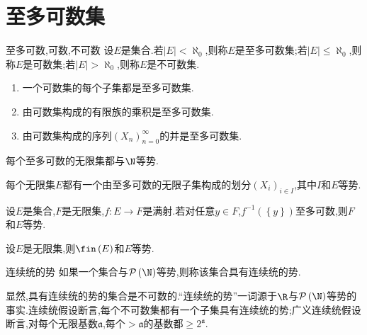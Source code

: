 \section{至多可数集}

\begin{definition}{至多可数,可数,不可数}{}
	设$E$是集合.若$\left|E\right|<\aleph_{0}$,则称$E$是至多可数集;若$\left|E\right|\leq\aleph_{0}$,则称$E$是可数集;若$\left|E\right|>\aleph_{0}$,则称$E$是不可数集.
\end{definition}

\begin{proposition}{}{}
	\begin{enumerate}
		\item 一个可数集的每个子集都是至多可数集.
		\item 由可数集构成的有限族的乘积是至多可数集.
		\item 由可数集构成的序列$\left(X_{n}\right)_{n=0}^{\infty}$的并是至多可数集.
	\end{enumerate}
\end{proposition}

\begin{proposition}{}{}
	每个至多可数的无限集都与$\N$等势.
\end{proposition}

\begin{proposition}{}{}
	每个无限集$E$都有一个由至多可数的无限子集构成的划分$\left(X_{i}\right)_{i\in I}$,其中$I$和$E$等势.
\end{proposition}

\begin{proposition}{}{}
	设$E$是集合,$F$是无限集,$f:E\to F$是满射.若对任意$y\in F$,$f^{-1}\left(\left\{y\right\}\right)$至多可数,则$F$和$E$等势.
\end{proposition}

\begin{proposition}{}{}
	设$E$是无限集,则$\fin\left(E\right)$和$E$等势.
\end{proposition}

\begin{definition}{连续统的势}{}
	如果一个集合与$\mathcal{P}\left(\N\right)$等势,则称该集合具有连续统的势.
\end{definition}

\begin{remark}{}{}
	显然,具有连续统的势的集合是不可数的.``连续统的势''一词源于$\R$与$\mathcal{P}\left(\N\right)$等势的事实.连续统假设断言,每个不可数集都有一个子集具有连续统的势;广义连续统假设断言,对每个无限基数$\mathfrak{a}$,每个$>\mathfrak{a}$的基数都$\geq 2^{\mathfrak{a}}$.
\end{remark}



























